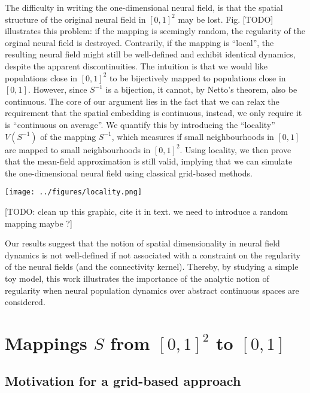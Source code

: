 \documentclass[10pt,letterpaper]{article}
\begin{document}
The difficulty in writing the one-dimensional neural field, is that the spatial structure of the original neural field in $[0,1]^2$ may be lost.
Fig. [TODO] illustrates this problem: if the mapping is seemingly random, the regularity of the orginal neural field is destroyed. Contrarily, if the mapping is ``local'', the resulting neural field might still be well-defined and exhibit identical dynamics, despite the apparent discontinuities.
The intuition is that we would like populations close in $[0,1]^2$ to be bijectively mapped to populations close in $[0,1]$. However, since $S^{-1}$ is a bijection, it cannot, by Netto's theorem, also be continuous. The core of our argument lies in the fact that we can relax the requirement that the spatial embedding is continuous, instead, we only require it is ``continuous on average''. We quantify this by introducing the ``locality'' $V(S^{-1})$ of the mapping $S^{-1}$, which measures if small neighbourhoods in $[0,1]$ are mapped to small neighbourhoods in $[0,1]^2$. Using locality, we then prove that the mean-field approximation is still valid, implying that we can simulate the one-dimensional neural field using classical grid-based methods.

\texttt{[image: ../figures/locality.png]}

[TODO: clean up this graphic, cite it in text. we need to introduce a random mapping maybe ?]
\endif




Our results suggest that the notion of spatial dimensionality in neural field dynamics is not well-defined if not associated with a constraint on the regularity of the neural fields (and the connectivity kernel). Thereby, by studying a simple toy model, this work illustrates the importance of the analytic notion of regularity when neural population dynamics over abstract continuous spaces are considered. 

\section{Mappings $S$ from $[0,1]^2$ to $[0,1]$}

\subsection{Motivation for a grid-based approach} \label{sec:grid-motivation}
\end{document}

